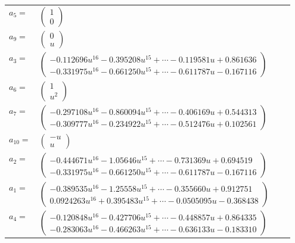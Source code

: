 \documentclass[1p]{elsarticle_modified}
\theoremstyle{definition}
\begin{document}
\begin{tabular}{m{7pt} m{180pt} m{7pt} m{180pt} }
\flushright $a_{5}=$&$\begin{pmatrix}1\\0\end{pmatrix}$ \\
\flushright $a_{9}=$&$\begin{pmatrix}0\\u\end{pmatrix}$ \\
\flushright $a_{3}=$&$\begin{pmatrix}-0.112696 u^{16}-0.395208 u^{15}+\cdots-0.119581 u+0.861636\\-0.331975 u^{16}-0.661250 u^{15}+\cdots-0.611787 u-0.167116\end{pmatrix}$ \\
\flushright $a_{6}=$&$\begin{pmatrix}1\\u^2\end{pmatrix}$ \\
\flushright $a_{7}=$&$\begin{pmatrix}-0.297108 u^{16}-0.860094 u^{15}+\cdots-0.406169 u+0.544313\\-0.309777 u^{16}-0.234922 u^{15}+\cdots-0.512476 u+0.102561\end{pmatrix}$ \\
\flushright $a_{10}=$&$\begin{pmatrix}- u\\u\end{pmatrix}$ \\
\flushright $a_{2}=$&$\begin{pmatrix}-0.444671 u^{16}-1.05646 u^{15}+\cdots-0.731369 u+0.694519\\-0.331975 u^{16}-0.661250 u^{15}+\cdots-0.611787 u-0.167116\end{pmatrix}$ \\
\flushright $a_{1}=$&$\begin{pmatrix}-0.389535 u^{16}-1.25558 u^{15}+\cdots-0.355660 u+0.912751\\0.0924263 u^{16}+0.395483 u^{15}+\cdots-0.0505095 u-0.368438\end{pmatrix}$ \\
\flushright $a_{4}=$&$\begin{pmatrix}-0.120848 u^{16}-0.427706 u^{15}+\cdots-0.448857 u+0.864335\\-0.283063 u^{16}-0.466263 u^{15}+\cdots-0.636133 u-0.183310\end{pmatrix}$ \\

\end{tabular}
\end{document}
